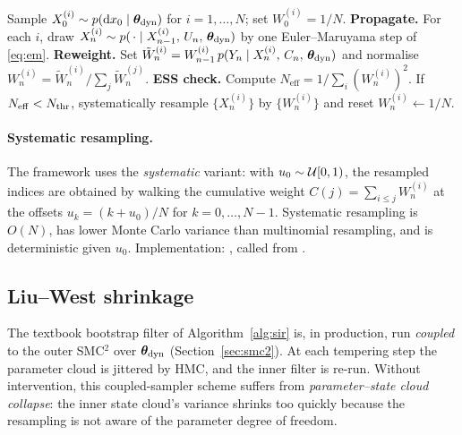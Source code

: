 \begin{algorithm}[H]
\caption{Bootstrap SIR for a fixed $\thetadyn$}
\label{alg:sir}
\begin{algorithmic}[1]
\State Sample $X_0^{(i)} \sim p(\mathrm{d} x_0 \mid \bm{\theta}_{\rm dyn})$ for
       $i = 1, \dots, N$; set $W_0^{(i)} = 1/N$.
  \State \textbf{Propagate.} For each $i$, draw
         $X_n^{(i)} \sim p(\,\cdot \mid X_{n-1}^{(i)},\, U_n,\, \bm{\theta}_{\rm dyn})$
         by one Euler--Maruyama step of \eqref{eq:em}.
  \State \textbf{Reweight.} Set
         $\tilde W_n^{(i)} = W_{n-1}^{(i)}\,
            p(Y_n \mid X_n^{(i)},\, C_n,\, \bm{\theta}_{\rm dyn})$ and normalise
         $W_n^{(i)} = \tilde W_n^{(i)} / \sum_j \tilde W_n^{(j)}$.
  \State \textbf{ESS check.} Compute $N_{\mathrm{eff}} =
         1/\sum_i (W_n^{(i)})^2$. If $N_{\mathrm{eff}} < N_{\rm thr}$,
         systematically resample $\{X_n^{(i)}\}$ by $\{W_n^{(i)}\}$ and
         reset $W_n^{(i)} \leftarrow 1/N$.
\EndFor
\end{algorithmic}
\end{algorithm}

\paragraph{Systematic resampling.} The framework uses the
\emph{systematic} variant: with $u_0 \sim \mathcal{U}[0, 1)$, the resampled
indices are obtained by walking the cumulative weight $C(j) =
\sum_{i \le j} W_n^{(i)}$ at the offsets $u_k = (k + u_0)/N$ for
$k = 0, \ldots, N-1$. Systematic resampling is $O(N)$, has lower
Monte Carlo variance than multinomial resampling, and is deterministic
given $u_0$. Implementation:
, called from
.

\subsection{Liu--West shrinkage} \label{sec:liu-west}

The textbook bootstrap filter of Algorithm~\ref{alg:sir} is, in
production, run \emph{coupled} to the outer SMC$^2$ over $\thetadyn$
(Section~\ref{sec:smc2}). At each tempering step the parameter cloud
is jittered by HMC, and the inner filter is re-run. Without
intervention, this coupled-sampler scheme suffers from
\emph{parameter--state cloud collapse}: the inner state cloud's
variance shrinks too quickly because the resampling is not aware of
the parameter degree of freedom.

